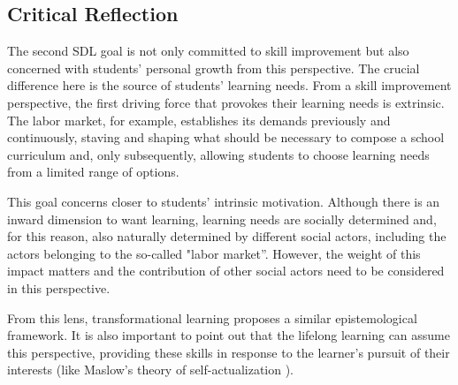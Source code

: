 
        


        

\subsection{Critical Reflection}
\label{sdl-goal-ss:reflection}

The second \gls{SDL} goal is not only committed to skill improvement but also concerned with students' personal growth from this perspective. The crucial difference here is the source of students’ learning needs. From a skill improvement perspective, the first driving force that provokes their learning needs is extrinsic. The labor market, for example, establishes its demands previously and continuously, staving and shaping what should be necessary to compose a school curriculum and, only subsequently, allowing students to choose learning needs from a limited range of options.

This goal concerns closer to students' intrinsic motivation. Although there is an inward dimension to want learning, learning needs are socially determined and, for this reason, also naturally determined by different social actors, including the actors belonging to the so-called "labor market”. However, the weight of this impact matters and the contribution of other social actors need to be considered in this perspective.


From this lens, transformational learning \cite{boyer:2006,vallance:2016} proposes a similar epistemological framework. It is also important to point out that the lifelong learning \cite{shen:2020,kastelan:2023} can assume this perspective, providing these skills in response to the learner’s pursuit of their interests (like Maslow's theory of self-actualization \cite{compton:2024}).

